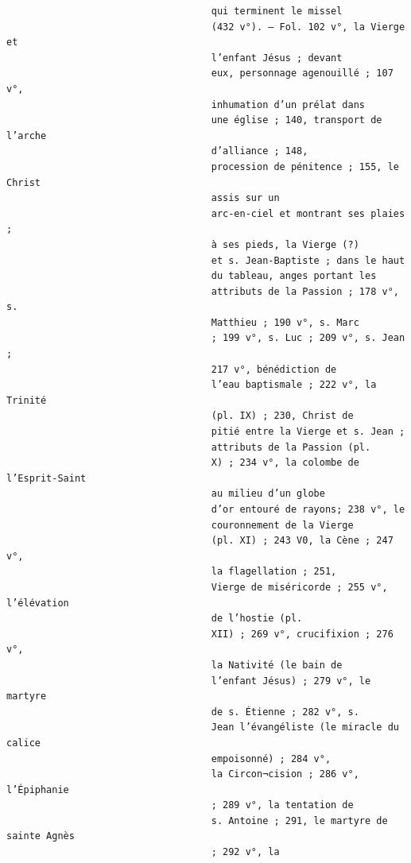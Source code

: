 \documentclass[a4paper,12pt,twoside]{book}
\begin{document}
\begin{verbatim}
                                    qui terminent le missel
                                    (432 v°). — Fol. 102 v°, la Vierge et
                                    l’enfant Jésus ; devant
                                    eux, personnage agenouillé ; 107 v°, 
                                    inhumation d’un prélat dans
                                    une église ; 140, transport de l’arche
                                    d’alliance ; 148,
                                    procession de pénitence ; 155, le Christ
                                    assis sur un
                                    arc-en-ciel et montrant ses plaies ;
                                    à ses pieds, la Vierge (?)
                                    et s. Jean-Baptiste ; dans le haut 
                                    du tableau, anges portant les
                                    attributs de la Passion ; 178 v°, s.
                                    Matthieu ; 190 v°, s. Marc
                                    ; 199 v°, s. Luc ; 209 v°, s. Jean ;
                                    217 v°, bénédiction de
                                    l’eau baptismale ; 222 v°, la Trinité
                                    (pl. IX) ; 230, Christ de
                                    pitié entre la Vierge et s. Jean ; 
                                    attributs de la Passion (pl.
                                    X) ; 234 v°, la colombe de l’Esprit-Saint
                                    au milieu d’un globe
                                    d’or entouré de rayons; 238 v°, le
                                    couronnement de la Vierge
                                    (pl. XI) ; 243 V0, la Cène ; 247 v°,
                                    la flagellation ; 251,
                                    Vierge de miséricorde ; 255 v°, l’élévation
                                    de l’hostie (pl.
                                    XII) ; 269 v°, crucifixion ; 276 v°,
                                    la Nativité (le bain de
                                    l’enfant Jésus) ; 279 v°, le martyre 
                                    de s. Étienne ; 282 v°, s.
                                    Jean l’évangéliste (le miracle du calice
                                    empoisonné) ; 284 v°,
                                    la Circon¬cision ; 286 v°, l’Épiphanie 
                                    ; 289 v°, la tentation de
                                    s. Antoine ; 291, le martyre de sainte Agnès
                                    ; 292 v°, la

\end{verbatim}
\end{document}
